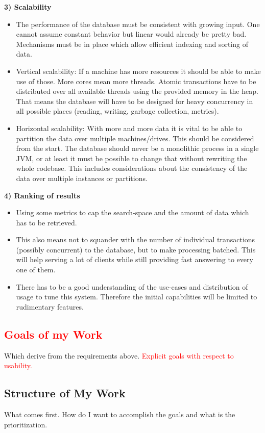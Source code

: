 \documentclass[11p]{scrartcl}
\begin{document}
\textbf{3) Scalability}
\begin{itemize}
	\item The performance of the database must be consistent with growing input. One cannot assume constant behavior but linear would already be pretty bad. Mechanisms must be in place which allow efficient indexing and sorting of data.	
	\item Vertical scalability: If a machine has more resources it should be able to make use of those. More cores mean more threads. Atomic transactions have to be distributed over all available threads using the  provided memory in the heap. That means the database will have to be designed for heavy concurrency in all possible places (reading, writing, garbage collection, metrics).
	\item Horizontal scalability: With more and more data it is vital to be able to partition the data over multiple machines/drives. This should be considered from the start. The database should never be a monolithic process in a single JVM, or at least it must be possible to change that without rewriting the whole codebase. This includes considerations about the consistency of the data over multiple instances or partitions.
\end{itemize}

\textbf{4) Ranking of results} \\
\begin{itemize}
	\item Using some metrics to cap the search-space and the amount of data which has to be retrieved.
	\item This also means not to squander with the number of individual transactions (possibly concurrent) to the database, but to make processing batched. This will help serving a lot of clients while still providing fast answering to every one of them.
	\item There has to be a good understanding of the use-cases and distribution of usage to tune this system. Therefore the initial capabilities will be limited to rudimentary features.
\end{itemize}
  

\subsection{\textcolor{red}{Goals of my Work}}
Which derive from the requirements above. \textcolor{red}{Explicit goals with respect to usability.}


\subsection{Structure of My Work}
What comes first. How do I want to accomplish the goals and what is the prioritization.
\end{document}

